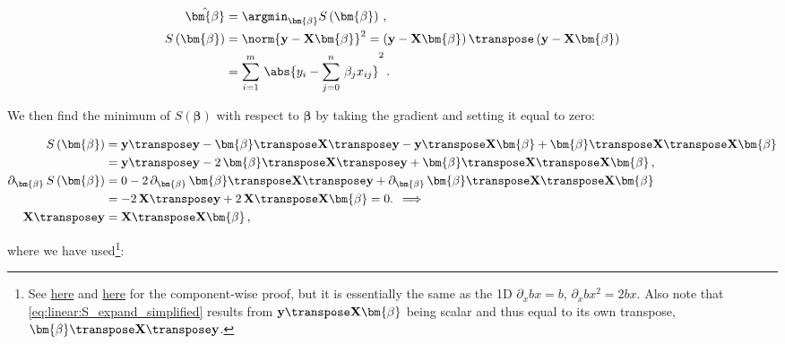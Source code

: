 \begin{subequations} \label{eq:linear:ols}
\begin{align}
\hat{\bm{\beta}} &= \argmin_{\bm{\beta}} S\left(\bm{\beta}\right)\,, \label{eq:linear:argmin} \\
S\left(\bm{\beta}\right)
&= \norm{\mathbf{y} - \mathbf{X} \bm{\beta}}^{2} = \left(\mathbf{y} - \mathbf{X} \bm{\beta}\right)\transpose \left(\mathbf{y} - \mathbf{X} \bm{\beta}\right) \label{eq:linear:S_matrix} \\
&= \sum_{i=1}^{m} \, \abs{y_{i} - \sum_{j=0}^{n} \, \beta_{j} x_{ij}}^{2}\,. \label{eq:linear:S_components}
\end{align}
\end{subequations}

We then find the minimum of $S\left(\bm{\beta}\right)$ with respect to $\bm{\beta}$
by taking the gradient and setting it equal to zero:

\begin{subequations} \label{eq:linear:ols_derivation}
\begin{align}
S\left(\bm{\beta}\right) &=
 \mathbf{y}\transpose \mathbf{y}
-\bm{\beta}\transpose \mathbf{X}\transpose \mathbf{y}
-\mathbf{y}\transpose \mathbf{X} \bm{\beta}
+\bm{\beta}\transpose \mathbf{X}\transpose \mathbf{X} \bm{\beta} \label{eq:linear:S_expand} \\
&= \mathbf{y}\transpose \mathbf{y}
-2\, \bm{\beta}\transpose \mathbf{X}\transpose \mathbf{y}
+\bm{\beta}\transpose \mathbf{X}\transpose \mathbf{X} \bm{\beta}\,, \label{eq:linear:S_expand_simplified} \\
\partial_{\bm{\beta}} \, S\left(\bm{\beta}\right) &=
0
-2\, \partial_{\bm{\beta}} \, \bm{\beta}\transpose \mathbf{X}\transpose \mathbf{y}
+\partial_{\bm{\beta}} \, \bm{\beta}\transpose \mathbf{X}\transpose \mathbf{X} \bm{\beta} \label{eq:linear:grad_S_expand} \\
&= -2\, \mathbf{X}\transpose \mathbf{y} + 2\, \mathbf{X}\transpose \mathbf{X} \bm{\beta} = 0. \, \implies \label{eq:linear:grad_S} \\
\mathbf{X}\transpose \mathbf{y} &= \mathbf{X}\transpose \mathbf{X} \bm{\beta}\,, \label{eq:linear:penultimate}
\end{align}
\end{subequations}

\noindent where we have used\footnote{See \href{https://economictheoryblog.com/2015/02/19/ols_estimator/}{here}
and \href{https://economictheoryblog.com/2018/10/17/derivation-of-the-least-squares-estimator-for-beta-in-matrix-notation-proof-nr-1/}{here}
for the component-wise proof, but it is essentially the same as the 1D $\partial_{x} b x = b$, $\partial_{x} b x^{2} = 2 b x$.
Also note that \cref{eq:linear:S_expand_simplified} results from $\mathbf{y}\transpose \mathbf{X} \bm{\beta}$ being scalar
and thus equal to its own transpose, $\bm{\beta}\transpose \mathbf{X}\transpose \mathbf{y}$.}:

